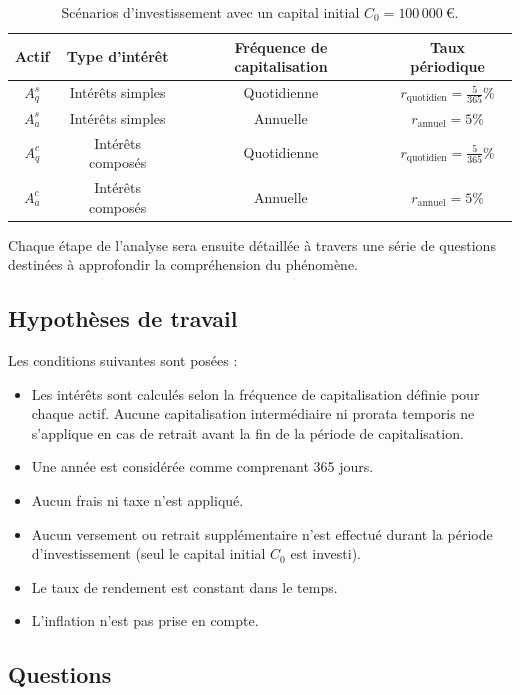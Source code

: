 \documentclass{article}
\begin{document}
\begin{table}[h!]
\centering
\begin{tabular}{|c|c|c|c|}
\hline
\textbf{Actif} & \textbf{Type d'intérêt} & \textbf{Fréquence de capitalisation} & \textbf{Taux périodique} \\
\hline
\(A_q^s\) & Intérêts simples & Quotidienne & \(r_\text{quotidien} = \frac{5}{365}\%\) \\
\hline
\(A_a^s\) & Intérêts simples & Annuelle & \(r_\text{annuel} = 5\%\) \\
\hline
\(A_q^c\) & Intérêts composés & Quotidienne & \(r_\text{quotidien} = \frac{5}{365}\%\) \\
\hline
\(A_a^c\) & Intérêts composés & Annuelle & \(r_\text{annuel} = 5\%\) \\
\hline
\end{tabular}
\caption{Scénarios d'investissement avec un capital initial \(C_0 = 100\,000\ \text{€}\).}
\label{tab:scenarios}
\end{table}

Chaque étape de l'analyse sera ensuite détaillée à travers une série de questions destinées à approfondir la compréhension du phénomène.

\subsection{Hypothèses de travail}
Les conditions suivantes sont posées :
\begin{itemize}
    \item Les intérêts sont calculés selon la fréquence de capitalisation définie pour chaque actif. Aucune capitalisation intermédiaire ni prorata temporis ne s'applique en cas de retrait avant la fin de la période de capitalisation.
    \item Une année est considérée comme comprenant 365 jours.
    \item Aucun frais ni taxe n'est appliqué.
    \item Aucun versement ou retrait supplémentaire n’est effectué durant la période d'investissement (seul le capital initial \( C_0 \) est investi).
    \item Le taux de rendement est constant dans le temps.
    \item L'inflation n'est pas prise en compte.
\end{itemize}

\subsection{Questions}
\end{document}
